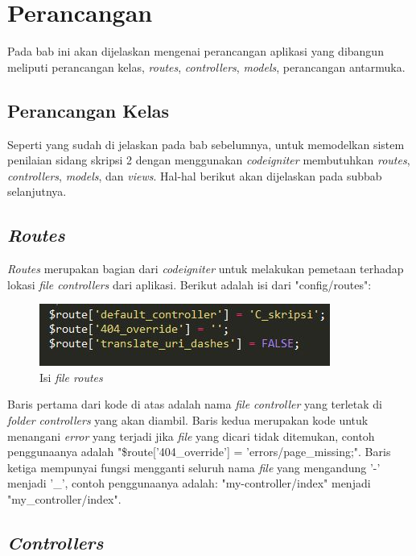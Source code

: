 \chapter{Perancangan}
\label{chap: perancangan}
	
	Pada bab ini akan dijelaskan mengenai perancangan aplikasi yang dibangun meliputi perancangan kelas, \textit{routes}, \textit{controllers}, \textit{models}, perancangan antarmuka.
	
	\section{Perancangan Kelas}
	\label{sec: rancangKelas}
	
	Seperti yang sudah di jelaskan pada bab sebelumnya, untuk memodelkan sistem penilaian sidang skripsi 2 dengan menggunakan \textit{codeigniter} membutuhkan \textit{routes}, \textit{controllers}, \textit{models}, dan \textit{views}. Hal-hal berikut akan dijelaskan pada subbab selanjutnya.
	
	\section{\textit{Routes}}
	\label{sec: routes}
	
	\textit{Routes} merupakan bagian dari \textit{codeigniter} untuk melakukan pemetaan terhadap lokasi \textit{file controllers} dari aplikasi. Berikut adalah isi dari "config/routes":
	\begin{figure}[H]
		\centering
		\includegraphics[scale= 1.0]{Gambar/routes}
		\caption {Isi \textit{file routes}}
		\label{fig:routes}
	\end{figure}
	Baris pertama dari kode di atas adalah nama \textit{file controller} yang terletak di \textit{folder controllers} yang akan diambil. Baris kedua merupakan kode untuk menangani \textit{error} yang terjadi jika \textit{file} yang dicari tidak ditemukan, contoh penggunaanya adalah "\$route['404\_override'] = 'errors/page\_missing;". Baris ketiga mempunyai fungsi mengganti seluruh nama \textit{file} yang mengandung '-' menjadi '\_', contoh penggunaanya adalah: "my-controller/index"	menjadi "my\_controller/index".

	\section{\textit{Controllers}}
	\label{sec: controllers}
	
